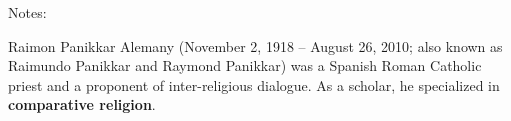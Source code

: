 \documentclass[11pt]{article}
\begin{document}
\begin{NOTES}


Notes:

Raimon Panikkar Alemany (November 2, 1918 -- August 26, 2010; also known as Raimundo Panikkar and Raymond Panikkar) was a Spanish Roman Catholic priest and a proponent of inter-religious dialogue. As a scholar, he specialized in \textbf{comparative religion}.
\end{NOTES}
\section*{}
\label{sec:org6e752b7}

\end{document}
